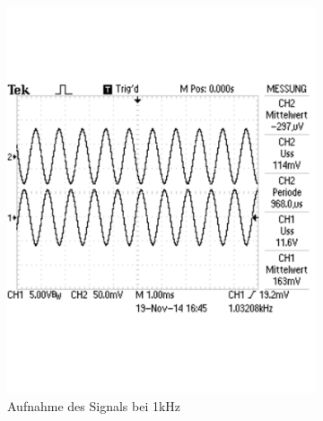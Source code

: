 \documentclass[12pt,a4paper]{article}
\begin{document}
\begin{figure}[H]
        \centering
        \begin{subfigure}[b]{0.28\textwidth}
                \includegraphics[width=\textwidth , scale = 0.4]{2_4_100_1k.pdf}
                \caption[Aufnahme des Signals bei 1kHz]{Aufnahme des Signals bei 1kHz}
                \label{fig:2_4_100_1k}
        \end{subfigure}%
        \hfill
        \begin{subfigure}[b]{0.28\textwidth}

\end{subfigure}
\end{figure}
\end{document}
